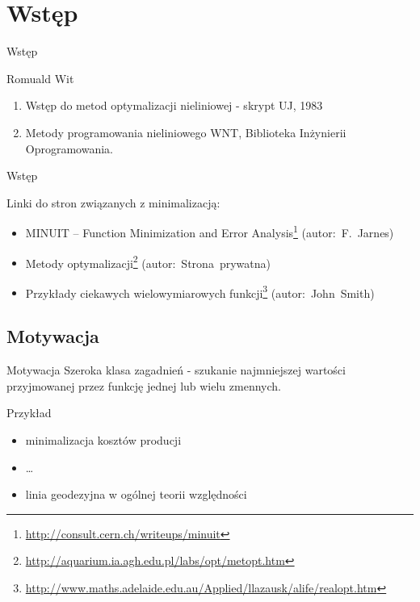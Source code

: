 \section{Wstęp}

  \begin{frame}{Wstęp}
    \begin{block}{Romuald Wit}
      \begin{enumerate}
        \item Wstęp do metod optymalizacji nieliniowej - skrypt
        UJ, 1983
        \item Metody programowania nieliniowego WNT, Biblioteka
        Inżynierii Oprogramowania.
      \end{enumerate}
    \end{block}

  \end{frame}

  \begin{frame}{Wstęp}
    \begin{block}{Linki do stron związanych z minimalizacją:}
      \begin{itemize}
        \item MINUIT -- Function Minimization and Error
        Analysis\footnote{\url{http://consult.cern.ch/writeups/minuit}}
        (autor:~F.~Jarnes)
        \item Metody optymalizacji\footnote{\url{http://aquarium.ia.agh.edu.pl/labs/opt/metopt.htm}}
        (autor:~Strona~prywatna)
        \item Przykłady ciekawych wielowymiarowych
        funkcji\footnote{\url{http://www.maths.adelaide.edu.au/Applied/llazausk/alife/realopt.htm}}
        (autor:~John~Smith)
      \end{itemize}
    \end{block}

  \end{frame}

\subsection{Motywacja}

  \begin{frame}{Motywacja}
    Szeroka klasa zagadnień - szukanie najmniejszej wartości
    przyjmowanej przez funkcję jednej lub wielu zmennych.

    \begin{exampleblock}{Przykład}
      \begin{itemize}
        \item minimalizacja kosztów producji
        \item \ldots
        \item linia geodezyjna w ogólnej teorii względności
      \end{itemize}
    \end{exampleblock}

  \end{frame}

